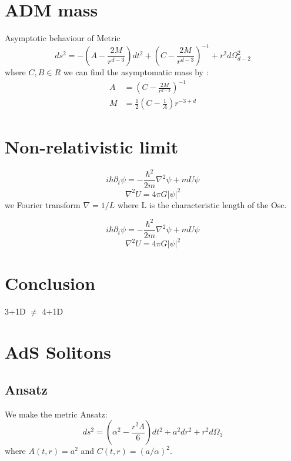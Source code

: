 \documentclass{article}
\begin{document}
\section{ADM mass}
Asymptotic behaviour of Metric
\begin{equation}
ds^2 = -\left(A-\frac{2M}{r^{d-3}}\right)dt^2+\left(C-\frac{2M}{r^{d-3}}\right)^{-1}+r^2d\Omega_{d-2}^2
\end{equation}
where $C,B \in R $ we can find the asymptomatic mass by : 
\begin{equation}
\begin{split}
A &= \left(C-\frac{2M}{r^{d-3}}\right)^{-1} \\
M &= \frac{1}{2} \left(C - \frac{1}{A} \right) r^{-3 + d}
\end{split}
\end{equation} 

\section{Non-relativistic limit}

\begin{equation}
i \hbar \partial_t \psi = - \frac{\hbar^2}{2m}\nabla^2 \psi + m U \psi
\end{equation}
\begin{equation}
\nabla^2 U = 4 \pi G | \psi |^2
\end{equation}
we Fourier transform $\nabla = 1/L$ where L is the characteristic length of the Osc. 

\begin{equation}
i \hbar \partial_t \psi = - \frac{\hbar^2}{2m}\nabla^2 \psi + m U \psi
\end{equation}
\begin{equation}
\nabla^2 U = 4 \pi G | \psi |^2
\end{equation}
\section{Conclusion}
3+1D $\neq$ 4+1D

\section{AdS Solitons }

\subsection{Ansatz}

We make the metric Ansatz: 
\begin{equation}
ds^2 = \left(\alpha^2 - \frac{r^2\Lambda}{6}\right) dt^2+a^2dr^2 + r^2 d\Omega_{3}
\end{equation}
where $A(t,r) = a^2$ and $C(t,r) = (a/\alpha)^2 $. \\  
\end{document}
